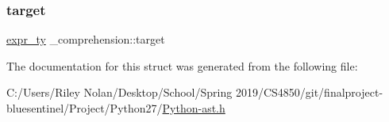 \mbox{\label{struct__comprehension_a810b2152a85f7ba984e54207d59d8124}} 
\subsubsection{\texorpdfstring{target}{target}}
{\footnotesize\ttfamily \mbox{\hyperlink{_python-ast_8h_a56d3705e020a071405094a220c4592bd}{expr\+\_\+ty}} \+\_\+comprehension\+::target}



The documentation for this struct was generated from the following file\+:\begin{DoxyCompactItemize}
\item 
C\+:/\+Users/\+Riley Nolan/\+Desktop/\+School/\+Spring 2019/\+C\+S4850/git/finalproject-\/bluesentinel/\+Project/\+Python27/\mbox{\hyperlink{_python-ast_8h}{Python-\/ast.\+h}}\end{DoxyCompactItemize}
